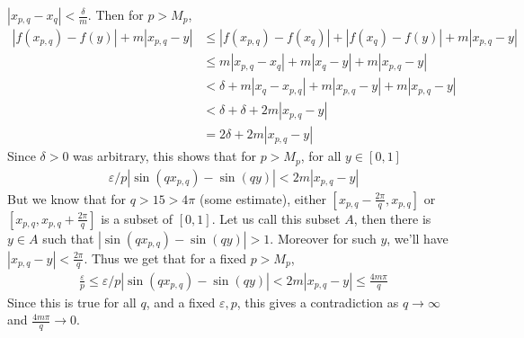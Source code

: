 \documentclass[12pt]{exam}
\theoremstyle{plain} %
\theoremstyle{definition} %
\theoremstyle{remark} %
\begin{document}
\begin{questions}
\begin{solution}
    $|x_{p, q} - x_q| < \frac{\delta}{m}$. Then for $p > M_p$,
    \begin{align*}
      |f(x_{p, q}) - f(y)| + m|x_{p, q} - y| &\le |f(x_{p, q}) -
      f(x_q)| + |f(x_q) - f( y)| + m | x_{p, q} - y| \\
      &\le m |x_{p, q} - x_q| + m|x_q - y| + m |x_{p, q} - y| \\
      &< \delta + m|x_{q} - x_{p, q}| + m|x_{p, q} - y| + m| x_{p,q} - y| \\
      &< \delta + \delta + 2m |x_{p, q} - y| \\
      &= 2\delta + 2m|x_{p, q} - y|
    \end{align*}
    Since $\delta > 0$ was arbitrary, this shows that for $p > M_p$,
    for all $y \in [0, 1]$
    \begin{align*}
      \varepsilon/p|\sin(qx_{p, q}) - \sin(qy)| < 2m |x_{p, q} - y|
    \end{align*}
    But we know that for $q > 15 > 4\pi$ (some estimate), either
    $[x_{p, q} - \frac{2\pi}{q}, x_{p, q}]$ or $[x_{p, q}, x_{p, q} +
    \frac{2\pi}{q}]$ is a subset of $[0, 1]$. Let us call this subset
    $A$, then there is $y \in A$ such that $|\sin(q x_{p, q}) -
    \sin(q y)|> 1$. Moreover for such $y$, we'll have $|x_{p, q} - y|
    < \frac{2\pi}{q}$. Thus we get that for a fixed $p > M_p$,
    \begin{align*}
      \frac{\varepsilon}{p} \le \varepsilon/p|\sin(qx_{p, q}) -
      \sin(qy)| < 2m |x_{p, q} - y| \le \frac{4m\pi}{q}
    \end{align*}
    Since this is true for all $q$, and a fixed $\varepsilon, p$,
    this gives a contradiction as $q \to \infty$ and $\frac{4m\pi}{q} \to 0$.


\end{solution}
\end{questions}
\end{document}
